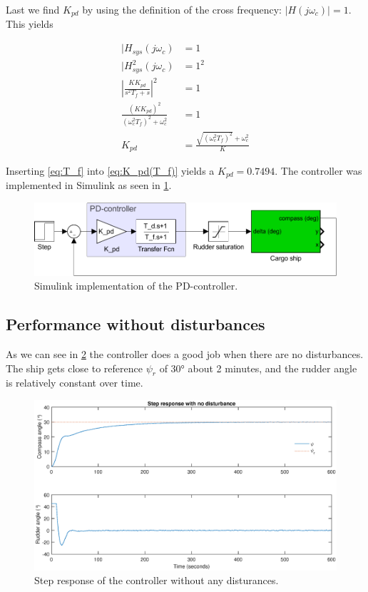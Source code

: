 Last we find $K_{pd}$ by using the definition of the cross frequency: $|H(j\omega_c)| = 1$. This yields

\begin{subequations}
    \begin{align}
        |H_{sys}(j\omega_c) &= 1 \\
        |H_{sys}^2(j\omega_c) &= 1^2 \\
        \left | \frac{KK_{pd}}{s^2T_f+s} \right |^2 &= 1 \\
        \frac{(KK_{pd})^2}{(\omega_c^2 T_f)^2 + \omega_c^2} &= 1 \\
        K_{pd} &= \frac{\sqrt{(\omega_c^2 T_f)^2} + \omega_c^2}{K} \label{eq:K_pd(T_f)}
    \end{align}
\end{subequations}

Inserting \cref{eq:T_f} into \cref{eq:K_pd(T_f)} yields a $K_{pd} = 0.7494$. The controller was implemented in Simulink as seen in \cref{fig:pd}.

\begin{figure}
    \centering
    \includegraphics[width=\textwidth]{images/oppg3/a_pd-loop.pdf}
    \caption{Simulink implementation of the PD-controller.}
    \label{fig:pd}
\end{figure}

\subsection{Performance without disturbances}

As we can see in \cref{fig:step_no_dist} the controller does a good job when there are no disturbances. The ship gets close to reference $\psi_r$ of $30\si{\degree}$ about 2 minutes, and the rudder angle is relatively constant over time.

\begin{figure}
    \centering
    \includegraphics[width=\textwidth]{images/oppg3/stepresp_no_disturbance.eps}
    \caption{Step response of the controller without any disturances.}
    \label{fig:step_no_dist}
\end{figure}

